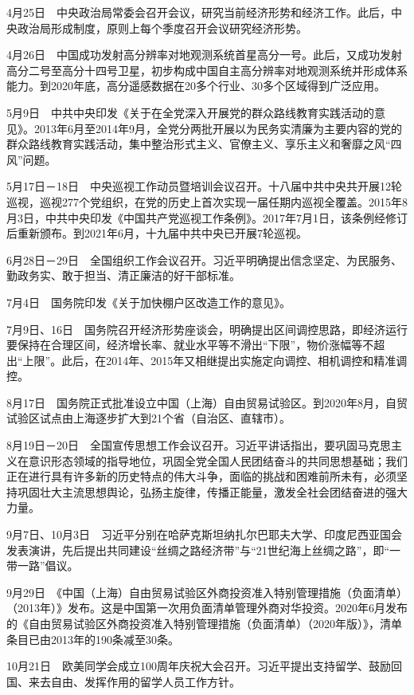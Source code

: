 \documentclass[10pt,a4paper,twocolumn]{book}
\begin{document}
4月25日　中央政治局常委会召开会议，研究当前经济形势和经济工作。此后，中央政治局形成制度，原则上每个季度召开会议研究经济形势。

4月26日　中国成功发射高分辨率对地观测系统首星高分一号。此后，又成功发射高分二号至高分十四号卫星，初步构成中国自主高分辨率对地观测系统并形成体系能力。到2020年底，高分遥感数据在20多个行业、30多个区域得到广泛应用。

5月9日　中共中央印发《关于在全党深入开展党的群众路线教育实践活动的意见》。2013年6月至2014年9月，全党分两批开展以为民务实清廉为主要内容的党的群众路线教育实践活动，集中整治形式主义、官僚主义、享乐主义和奢靡之风“四风”问题。

5月17日－18日　中央巡视工作动员暨培训会议召开。十八届中共中央共开展12轮巡视，巡视277个党组织，在党的历史上首次实现一届任期内巡视全覆盖。2015年8月3日，中共中央印发《中国共产党巡视工作条例》。2017年7月1日，该条例经修订后重新颁布。到2021年6月，十九届中共中央已开展7轮巡视。

6月28日－29日　全国组织工作会议召开。习近平明确提出信念坚定、为民服务、勤政务实、敢于担当、清正廉洁的好干部标准。

7月4日　国务院印发《关于加快棚户区改造工作的意见》。

7月9日、16日　国务院召开经济形势座谈会，明确提出区间调控思路，即经济运行要保持在合理区间，经济增长率、就业水平等不滑出“下限”，物价涨幅等不超出“上限”。此后，在2014年、2015年又相继提出实施定向调控、相机调控和精准调控。

8月17日　国务院正式批准设立中国（上海）自由贸易试验区。到2020年8月，自贸试验区试点由上海逐步扩大到21个省（自治区、直辖市）。

8月19日－20日　全国宣传思想工作会议召开。习近平讲话指出，要巩固马克思主义在意识形态领域的指导地位，巩固全党全国人民团结奋斗的共同思想基础；我们正在进行具有许多新的历史特点的伟大斗争，面临的挑战和困难前所未有，必须坚持巩固壮大主流思想舆论，弘扬主旋律，传播正能量，激发全社会团结奋进的强大力量。

9月7日、10月3日　习近平分别在哈萨克斯坦纳扎尔巴耶夫大学、印度尼西亚国会发表演讲，先后提出共同建设“丝绸之路经济带”与“21世纪海上丝绸之路”，即“一带一路”倡议。

9月29日　《中国（上海）自由贸易试验区外商投资准入特别管理措施（负面清单）（2013年）》发布。这是中国第一次用负面清单管理外商对华投资。2020年6月发布的《自由贸易试验区外商投资准入特别管理措施（负面清单）（2020年版）》，清单条目已由2013年的190条减至30条。

10月21日　欧美同学会成立100周年庆祝大会召开。习近平提出支持留学、鼓励回国、来去自由、发挥作用的留学人员工作方针。
\end{document}
